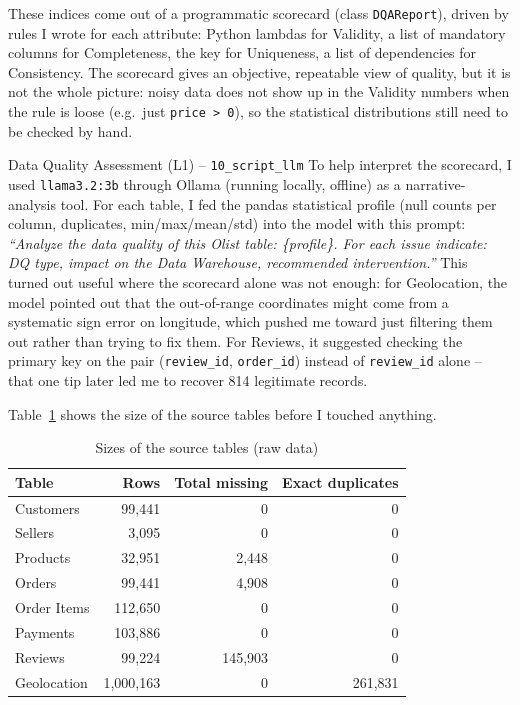 \documentclass[12pt,a4paper]{article}
\begin{document}
These indices come out of a programmatic scorecard (class \texttt{DQAReport}), driven
by rules I wrote for each attribute: Python lambdas for Validity, a list of mandatory
columns for Completeness, the key for Uniqueness, a list of dependencies for
Consistency. The scorecard gives an objective, repeatable view of quality, but it is
not the whole picture: noisy data does not show up in the Validity numbers when the
rule is loose (e.g.\ just \texttt{price > 0}), so the statistical distributions still
need to be checked by hand.

\begin{aibox}{Data Quality Assessment (L1) -- \texttt{10\_script\_llm}}
To help interpret the scorecard, I used \texttt{llama3.2:3b} through Ollama (running
locally, offline) as a narrative-analysis tool. For each table, I fed the pandas
statistical profile (null counts per column, duplicates, min/max/mean/std) into the
model with this prompt: \textit{``Analyze the data quality of this Olist table:
\{profile\}. For each issue indicate: DQ type, impact on the Data Warehouse,
recommended intervention.''}
This turned out useful where the scorecard alone was not enough: for Geolocation, the
model pointed out that the out-of-range coordinates might come from a systematic sign
error on longitude, which pushed me toward just filtering them out rather than trying
to fix them. For Reviews, it suggested checking the primary key on the pair
(\texttt{review\_id}, \texttt{order\_id}) instead of \texttt{review\_id} alone --
that one tip later led me to recover 814 legitimate records.
\end{aibox}

Table~\ref{tab:raw} shows the size of the source tables before I touched anything.

\begin{table}[H]
  \centering
  \caption{Sizes of the source tables (raw data)}
  \label{tab:raw}
  \begin{tabular}{lrrr}
    \toprule
    \textbf{Table} & \textbf{Rows} & \textbf{Total missing} & \textbf{Exact duplicates} \\
    \midrule
    Customers    &   99,441 &       0 &       0 \\
    Sellers      &    3,095 &       0 &       0 \\
    Products     &   32,951 &   2,448 &       0 \\
    Orders       &   99,441 &   4,908 &       0 \\
    Order Items  &  112,650 &       0 &       0 \\
    Payments     &  103,886 &       0 &       0 \\
    Reviews      &   99,224 & 145,903 &       0 \\
    Geolocation  & 1,000,163 &      0 & 261,831 \\
    \bottomrule
  \end{tabular}
\end{table}
\end{document}
